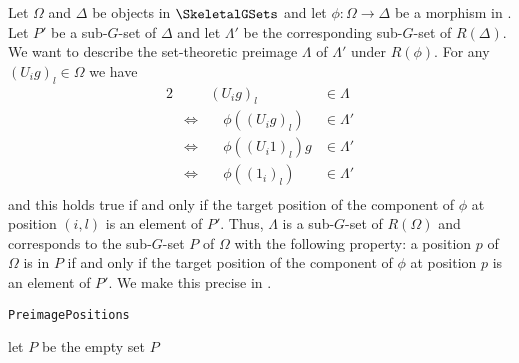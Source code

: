 \begin{rem}
Let $\Omega$ and $\Delta$ be objects in $\SkeletalGSets$ and let $\phi\colon \Omega \to \Delta$ be a morphism in \SkeletalGSets{}. Let $P'$ be a sub-$G$-set of $\Delta$ and let $\Lambda'$ be the corresponding sub-$G$-set of $R(\Delta)$. We want to describe the set-theoretic preimage $\Lambda$ of $\Lambda'$ under $R(\phi)$. For any $(U_ig)_l \in \Omega$ we have
\begin{alignat*}{2}
&& (U_ig)_l &\in \Lambda\\
&\Leftrightarrow &\quad\phi((U_ig)_l) &\in \Lambda'\\
&\Leftrightarrow &\quad\phi((U_i1)_l)g &\in \Lambda'\\
&\Leftrightarrow &\quad\phi((1_i)_l) &\in \Lambda'\\
\end{alignat*}
and this holds true if and only if the target position of the component of $\phi$ at position $(i,l)$ is an element of $P'$. Thus, $\Lambda$ is a sub-$G$-set of $R(\Omega)$ and corresponds to the sub-$G$-set $P$ of $\Omega$ with the following property: a position $p$ of $\Omega$ is in $P$ if and only if the target position of the component of $\phi$ at position $p$ is an element of $P'$. We make this precise in .
\end{rem}

\begin{algorithm}\capstart
    \caption{\texttt{PreimagePositions}}\label{algo:PreimagePositions}
	\BlankLine
	let $P$ be the empty set\;
	\BlankLine
	\Return $P$\;
\end{algorithm}

